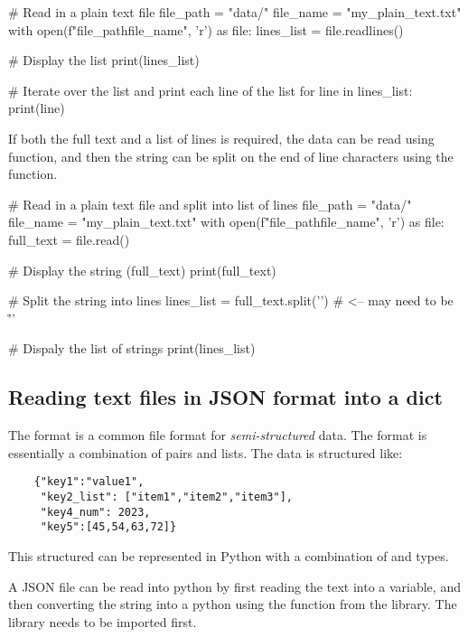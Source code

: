 \begin{pycode}
    # Read in a plain text file
    file_path = "data/"
    file_name = "my_plain_text.txt"
    with open(f"{file_path}{file_name}", 'r') as file:
    lines_list = file.readlines()

    # Display the list
    print(lines_list)

    # Iterate over the list and print each line of the list
    for line in lines_list:
    print(line)
\end{pycode}

If both the full text and a list of lines is required, the data can be read using  function, and then the string can be split on the end of line characters using the  function.


\begin{pycode}
    # Read in a plain text file and split into list of lines
    file_path = "data/"
    file_name = "my_plain_text.txt"
    with open(f"{file_path}{file_name}", 'r') as file:
    full_text = file.read()

    # Display the string (full_text)
    print(full_text)

    # Split the string into lines
    lines_list = full_text.split('\n')  # <-- may need to be '\r\n'

    # Dispaly the  list of strings
    print(lines_list)

\end{pycode}

\subsection{Reading text files in JSON format into a dict}

The  format is a common file format for \textit{semi-structured} data. The format is essentially a combination of  pairs and lists. The data is structured like:

\begin{verbatim}
    {"key1":"value1",
     "key2_list": ["item1","item2","item3"],
     "key4_num": 2023,
     "key5":[45,54,63,72]}
\end{verbatim}

This structured can be represented in Python with a combination of  and  types.

A JSON file can be read into python by first reading the text into a  variable, and then converting the string into a python  using the  function from the  library. The library needs to be imported first.


